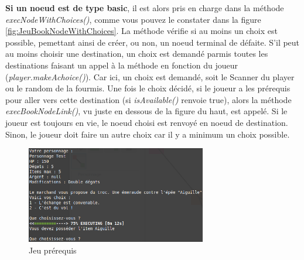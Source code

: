 			\textbf{Si un noeud est de type basic}, il est alors pris en charge dans la méthode \textit{execNodeWithChoices()}, comme vous pouvez le constater dans la figure \ref{fig:JeuBookNodeWithChoices}. La méthode vérifie si au moins un choix est possible, pemettant ainsi de créer, ou non, un noeud terminal de défaite. S'il peut au moins choisir une destination, un choix est demandé parmis toutes les destinations faisant un appel à la méthode en fonction du joueur (\textit{player.makeAchoice()}). Car ici, un choix est demandé, soit le Scanner du player ou le random de la fourmis. Une fois le choix décidé, si le joueur a les prérequis pour aller vers cette destination (si \textit{isAvailable()} renvoie true), alors la méthode \textit{execBookNodeLink()}, vu juste en dessous de la figure du haut, est appelé. Si le joueur est toujours en vie, le noeud choisi est renvoyé en noeud de destination. Sinon, le joueur doit faire un autre choix car il y a minimum un choix possible.\\

			\begin{figure}[H]
				\centering\includegraphics[width=0.70\textwidth]{img/codeJeuPrerequis.png}
				\caption{Jeu prérequis}
				\label{fig:codeJeuPrerequis}
			\end{figure}

